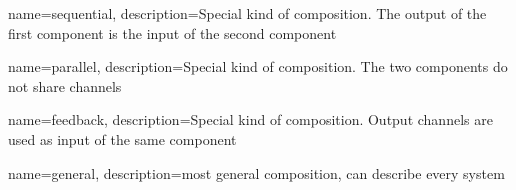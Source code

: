{
    name=sequential,
    description={Special kind of composition. The output of the first component is the input of the second component}
}

{
    name=parallel,
    description={Special kind of composition. The two components do not share channels}
}

{
    name=feedback,
    description={Special kind of composition. Output channels are used as input of the same component}
}

{
    name=general,
    description={most general composition, can describe every system}
}
